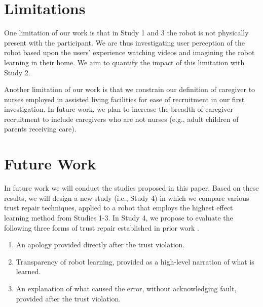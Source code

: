 \documentclass[letterpaper]{article} %
\begin{document}
\section{Limitations}
\label{sec:limitations}
One limitation of our work is that in Study 1 and 3 the robot is not physically present with the participant. We are thus investigating user perception of the robot based upon the users' experience watching videos and imagining the robot learning in their home. We aim to quantify the impact of this limitation with Study 2.

Another limitation of our work is that we constrain our definition of caregiver to nurses employed in assisted living facilities for ease of recruitment in our first investigation. In future work, we plan to increase the breadth of caregiver recruitment to include caregivers who are not nurses (e.g., adult children of parents receiving care). %


\section{Future Work}
\label{sec:futurework}
In future work we will conduct the studies proposed in this paper. Based on these results, we will design a new study (i.e., Study 4) in which we compare various trust repair techniques, applied to a robot that employs the highest effect learning method from Studies 1-3. In Study 4, we propose to evaluate the following three forms of trust repair established in prior work \cite{de_visser_towards_2020, baker_toward_2018, robinette_timing_2015, kim_repairing_2013}.

\begin{enumerate}
    \item An apology provided directly after the trust violation.
    \item Transparency of robot learning, provided as a high-level narration of what is learned.
    \item An explanation of what caused the error, without acknowledging fault, provided after the trust violation.
\end{enumerate}
\end{document}
